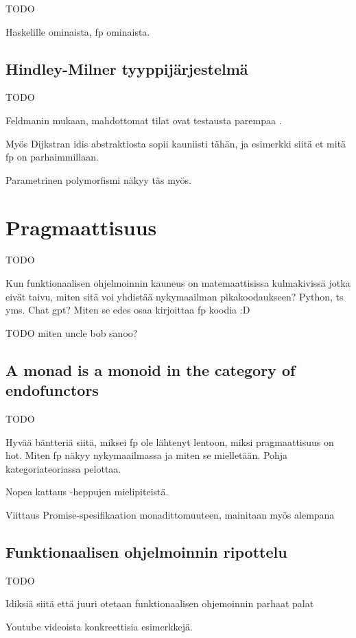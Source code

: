 TODO

Haskelille ominaista, \gls{fp} ominaista.


\subsection{Hindley-Milner tyyppijärjestelmä}

TODO

Feldmanin mukaan, mahdottomat tilat ovat testausta parempaa \cite{impossiblebetter}.

Myös Dijkstran idis abstraktiosta sopii kauniisti tähän, ja esimerkki siitä et mitä \gls{fp} on parhaimmillaan.

Parametrinen polymorfismi näkyy täs myös.

\section{Pragmaattisuus}

TODO

Kun funktionaalisen ohjelmoinnin kauneus on matemaattisissa kulmakivissä jotka eivät taivu, miten sitä voi yhdistää nykymaailman pikakoodaukseen? Python, \gls{ts} yms. Chat gpt? Miten se edes osaa kirjoittaa fp koodia :D

TODO miten uncle bob sanoo? \cite{martin2017pragmaticfp}

\subsection{A monad is a monoid in the category of endofunctors}

TODO

Hyvää bäntteriä siitä, miksei fp ole lähtenyt lentoon, miksi pragmaattisuus on hot. Miten fp näkyy nykymaailmassa ja miten se mielletään. Pohja kategoriateoriassa pelottaa.

Nopea kattaus  -heppujen mielipiteistä.

Viittaus Promise-spesifikaation monadittomuuteen, mainitaan myös alempana

\subsection{Funktionaalisen ohjelmoinnin ripottelu}

TODO

Idiksiä siitä että juuri otetaan funktionaalisen ohjemoinnin parhaat palat

Youtube videoista konkreettisia esimerkkejä.

